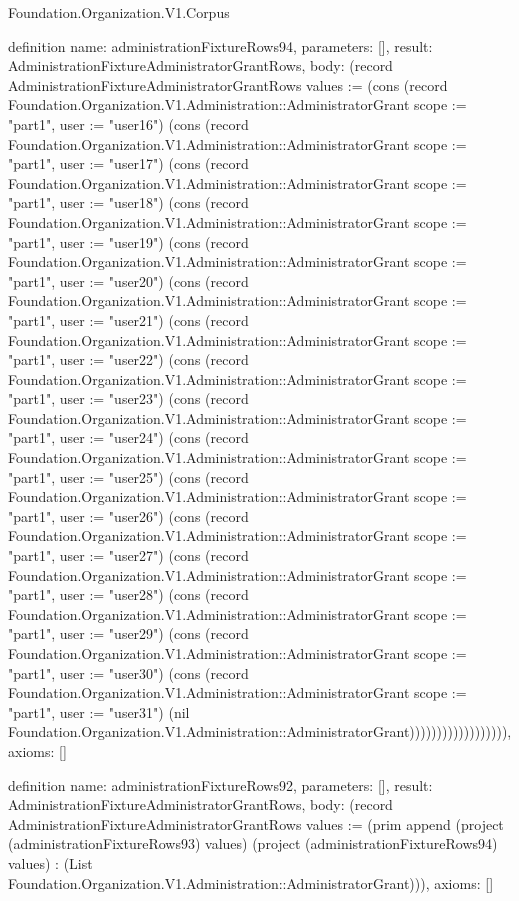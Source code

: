 \begin{lexlean}{Foundation.Organization.V1.Corpus}
\begin{semanticmodule}
definition{
  name: administrationFixtureRows94,
  parameters: [],
  result: AdministrationFixtureAdministratorGrantRows,
  body: (record AdministrationFixtureAdministratorGrantRows {values := (cons (record Foundation.Organization.V1.Administration::AdministratorGrant {scope := "part1", user := "user16"}) (cons (record Foundation.Organization.V1.Administration::AdministratorGrant {scope := "part1", user := "user17"}) (cons (record Foundation.Organization.V1.Administration::AdministratorGrant {scope := "part1", user := "user18"}) (cons (record Foundation.Organization.V1.Administration::AdministratorGrant {scope := "part1", user := "user19"}) (cons (record Foundation.Organization.V1.Administration::AdministratorGrant {scope := "part1", user := "user20"}) (cons (record Foundation.Organization.V1.Administration::AdministratorGrant {scope := "part1", user := "user21"}) (cons (record Foundation.Organization.V1.Administration::AdministratorGrant {scope := "part1", user := "user22"}) (cons (record Foundation.Organization.V1.Administration::AdministratorGrant {scope := "part1", user := "user23"}) (cons (record Foundation.Organization.V1.Administration::AdministratorGrant {scope := "part1", user := "user24"}) (cons (record Foundation.Organization.V1.Administration::AdministratorGrant {scope := "part1", user := "user25"}) (cons (record Foundation.Organization.V1.Administration::AdministratorGrant {scope := "part1", user := "user26"}) (cons (record Foundation.Organization.V1.Administration::AdministratorGrant {scope := "part1", user := "user27"}) (cons (record Foundation.Organization.V1.Administration::AdministratorGrant {scope := "part1", user := "user28"}) (cons (record Foundation.Organization.V1.Administration::AdministratorGrant {scope := "part1", user := "user29"}) (cons (record Foundation.Organization.V1.Administration::AdministratorGrant {scope := "part1", user := "user30"}) (cons (record Foundation.Organization.V1.Administration::AdministratorGrant {scope := "part1", user := "user31"}) (nil Foundation.Organization.V1.Administration::AdministratorGrant)))))))))))))))))}),
  axioms: []
}

definition{
  name: administrationFixtureRows92,
  parameters: [],
  result: AdministrationFixtureAdministratorGrantRows,
  body: (record AdministrationFixtureAdministratorGrantRows {values := (prim append (project (administrationFixtureRows93) values) (project (administrationFixtureRows94) values) : (List Foundation.Organization.V1.Administration::AdministratorGrant))}),
  axioms: []
}


\end{semanticmodule}
\end{lexlean}
